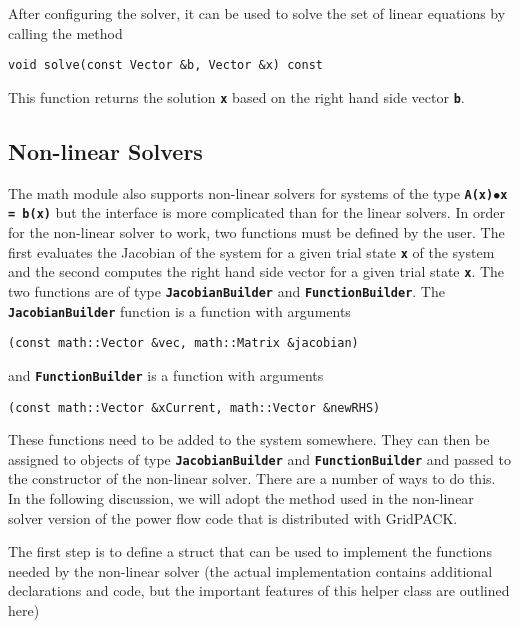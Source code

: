 After configuring the solver, it can be used to solve the set of linear equations by calling the method

{
\color{red}
\begin{Verbatim}[fontseries=b]
void solve(const Vector &b, Vector &x) const
\end{Verbatim}
}

This function returns the solution \texttt{\textbf{x}} based on the right hand side vector \texttt{\textbf{b}}.

\subsection{Non-linear Solvers}

The math module also supports non-linear solvers for systems of the type \texttt{\textbf{A(x)$\boldsymbol{\mathrm{\bullet}}$x = b(x)}} but the interface is more complicated than for the linear solvers. In order for the non-linear solver to work, two functions must be defined by the user. The first evaluates the Jacobian of the system for a given trial state \texttt{\textbf{x}} of the system and the second computes the right hand side vector for a given trial state \texttt{\textbf{x}}. The two functions are of type \texttt{\textbf{JacobianBuilder}} and \texttt{\textbf{FunctionBuilder}}. The \texttt{\textbf{JacobianBuilder}} function is a function with arguments

{
\color{red}
\begin{Verbatim}[fontseries=b]
    (const math::Vector &vec, math::Matrix &jacobian)
\end{Verbatim}
}

and \texttt{\textbf{FunctionBuilder}} is a function with arguments

{
\color{red}
\begin{Verbatim}[fontseries=b]
    (const math::Vector &xCurrent, math::Vector &newRHS)
\end{Verbatim}
}

These functions need to be added to the system somewhere. They can then be assigned to objects of type \texttt{\textbf{JacobianBuilder}} and \texttt{\textbf{FunctionBuilder}} and passed to the constructor of the non-linear solver. There are a number of ways to do this. In the following discussion, we will adopt the method used in the non-linear solver version of the power flow code that is distributed with GridPACK.

The first step is to define a struct that can be used to implement the functions needed by the non-linear solver (the actual implementation contains additional declarations and code, but the important features of this helper class are outlined here)

